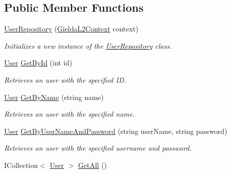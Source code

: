 \subsection*{Public Member Functions}
\begin{DoxyCompactItemize}
\item 
\mbox{\hyperlink{class_gielda_l2_1_1_i_n_f_r_a_s_t_r_u_c_t_u_r_e_1_1_repositories_1_1_user_repository_ab90832b2de2f213d9cd05aee989a0a13}{User\+Repository}} (\mbox{\hyperlink{class_gielda_l2_1_1_d_b_1_1_gielda_l2_context}{Gielda\+L2\+Context}} context)
\begin{DoxyCompactList}\small\item\em Initializes a new instance of the \mbox{\hyperlink{class_gielda_l2_1_1_i_n_f_r_a_s_t_r_u_c_t_u_r_e_1_1_repositories_1_1_user_repository}{User\+Repository}} class. \end{DoxyCompactList}\item 
\mbox{\hyperlink{class_gielda_l2_1_1_d_b_1_1_entities_1_1_user}{User}} \mbox{\hyperlink{class_gielda_l2_1_1_i_n_f_r_a_s_t_r_u_c_t_u_r_e_1_1_repositories_1_1_user_repository_a59783783c8210efff03a749d4f63fadf}{Get\+By\+Id}} (int id)
\begin{DoxyCompactList}\small\item\em Retrieves an user with the specified ID. \end{DoxyCompactList}\item 
\mbox{\hyperlink{class_gielda_l2_1_1_d_b_1_1_entities_1_1_user}{User}} \mbox{\hyperlink{class_gielda_l2_1_1_i_n_f_r_a_s_t_r_u_c_t_u_r_e_1_1_repositories_1_1_user_repository_af81e3935a282ab7b2e4d8bdf7b379771}{Get\+By\+Name}} (string name)
\begin{DoxyCompactList}\small\item\em Retrieves an user with the specified name. \end{DoxyCompactList}\item 
\mbox{\hyperlink{class_gielda_l2_1_1_d_b_1_1_entities_1_1_user}{User}} \mbox{\hyperlink{class_gielda_l2_1_1_i_n_f_r_a_s_t_r_u_c_t_u_r_e_1_1_repositories_1_1_user_repository_a6ddb02c156ab0944804a41a5a9531482}{Get\+By\+User\+Name\+And\+Password}} (string user\+Name, string password)
\begin{DoxyCompactList}\small\item\em Retrieves an user with the specified username and password. \end{DoxyCompactList}\item 
I\+Collection$<$ \mbox{\hyperlink{class_gielda_l2_1_1_d_b_1_1_entities_1_1_user}{User}} $>$ \mbox{\hyperlink{class_gielda_l2_1_1_i_n_f_r_a_s_t_r_u_c_t_u_r_e_1_1_repositories_1_1_user_repository_ab9a56b5b0dfe9cf6350eebcf751adcfc}{Get\+All}} ()

\end{DoxyCompactItemize}
